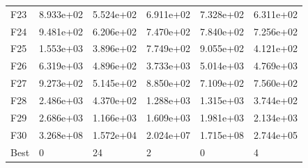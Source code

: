 \begin{tabular}{llllll}
F23  &  8.933e+02 &  5.524e+02 &  6.911e+02 &  7.328e+02 &  6.311e+02 \\
F24  &  9.481e+02 &  6.206e+02 &  7.470e+02 &  7.840e+02 &  7.256e+02 \\
F25  &  1.553e+03 &  3.896e+02 &  7.749e+02 &  9.055e+02 &  4.121e+02 \\
F26  &  6.319e+03 &  4.896e+02 &  3.733e+03 &  5.014e+03 &  4.769e+03 \\
F27  &  9.273e+02 &  5.145e+02 &  8.850e+02 &  7.109e+02 &  7.560e+02 \\
F28  &  2.486e+03 &  4.370e+02 &  1.288e+03 &  1.315e+03 &  3.744e+02 \\
F29  &  2.686e+03 &  1.166e+03 &  1.609e+03 &  1.981e+03 &  2.134e+03 \\
F30  &  3.268e+08 &  1.572e+04 &  2.024e+07 &  1.715e+08 &  2.744e+05 \\
Best &          0 &         24 &          2 &          0 &          4 \\
\bottomrule
\end{tabular}
